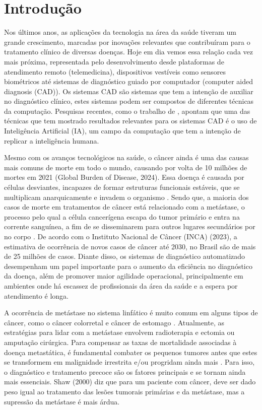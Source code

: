 \section{Introdução}

Nos últimos anos, as aplicações da tecnologia na área da saúde tiveram um grande crescimento, marcadas por inovações relevantes que contribuíram para o tratamento clínico de diversas doenças. Hoje em dia vemos essa relação cada vez mais próxima, representada pelo desenvolvimento desde plataformas de atendimento remoto (telemedicina), dispositivos vestíveis como sensores biométricos até sistemas de diagnóstico guiado por computador (computer aided diagnosis (CAD)). Os sistemas CAD são sistemas que tem a intenção de auxiliar no diagnóstico clínico, estes sistemas podem ser compostos de diferentes técnicas da computação. Pesquisas recentes, como o trabalho de , apontam que uma das técnicas que tem mostrado resultados relevantes para os sistemas CAD é o uso de Inteligência Artificial (IA), um campo da computação que tem a intenção de replicar a inteligência humana. 

Mesmo com os avanços tecnológicos na saúde, o câncer ainda é uma das causas mais comuns de morte em todo o mundo, causando por volta de 10 milhões de mortes em 2021 (Global Burden of Disease, 2024). Essa doença é causada por células desviantes, incapazes de formar estruturas funcionais estáveis, que se multiplicam anarquicamente e invadem o organismo \cite{FLOOR2012509} . Sendo que, a maioria dos casos de morte em tratamentos de câncer está relacionado com a metástase, o processo pelo qual a célula cancerígena escapa do tumor primário e entra na corrente sanguínea, a fim de se disseminarem para outros lugares secundários por no corpo \cite{THAM201181}. De acordo com o Instituto Nacional de Câncer (INCA) (2023), a estimativa de ocorrência de novos casos de câncer até 2030, no Brasil são de mais de 25 milhões de casos. Diante disso, os sistemas de diagnóstico automatizado desempenham um papel importante para o aumento da eficiência no diagnóstico da doença, além de promover maior agilidade operacional, principalmente em ambientes onde há escassez de profissionais da área da saúde e a espera por atendimento é longa.

A ocorrência de metástase no sistema linfático é muito comum em alguns tipos de câncer, como o câncer colorretal e câncer de estomago \cite{Sano1992}. Atualmente, as estratégias para lidar com a metástase envolvem radioterapia e ectomia ou amputação cirúrgica.
Para compensar as taxas de mortalidade associadas à doença metastática, é fundamental combater os pequenos tumores antes que estes se transformem em malignidade irrestrita e/ou progridam ainda mais \cite{DAS2020119556}. Para isso, o diagnóstico e tratamento precoce são os fatores principais e se tornam ainda mais essenciais.
Shaw (2000) diz que para um paciente com câncer, deve ser dado peso igual ao tratamento das lesões tumorais primárias e da metástase, mas a supressão da metástase é mais árdua.


